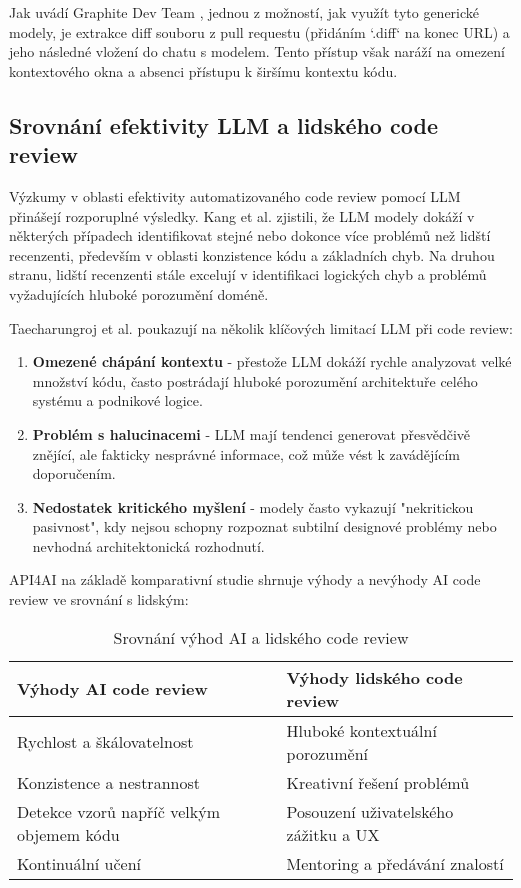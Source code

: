 \documentclass[12pt, a4paper]{article}
\begin{document}
Jak uvádí Graphite Dev Team \cite{graphite2023}, jednou z možností, jak využít tyto generické modely, je extrakce diff souboru z pull requestu (přidáním `.diff` na konec URL) a jeho následné vložení do chatu s modelem. Tento přístup však naráží na omezení kontextového okna a absenci přístupu k širšímu kontextu kódu.

\subsection{Srovnání efektivity LLM a lidského code review}

Výzkumy v oblasti efektivity automatizovaného code review pomocí LLM přinášejí rozporuplné výsledky. Kang et al. \cite{kang2023} zjistili, že LLM modely dokáží v některých případech identifikovat stejné nebo dokonce více problémů než lidští recenzenti, především v oblasti konzistence kódu a základních chyb. Na druhou stranu, lidští recenzenti stále excelují v identifikaci logických chyb a problémů vyžadujících hluboké porozumění doméně.

Taecharungroj et al. \cite{taecharungroj2023} poukazují na několik klíčových limitací LLM při code review:

\begin{enumerate}
    \item \textbf{Omezené chápání kontextu} - přestože LLM dokáží rychle analyzovat velké množství kódu, často postrádají hluboké porozumění architektuře celého systému a podnikové logice.
    \item \textbf{Problém s halucinacemi} - LLM mají tendenci generovat přesvědčivě znějící, ale fakticky nesprávné informace, což může vést k zavádějícím doporučením.
    \item \textbf{Nedostatek kritického myšlení} - modely často vykazují "nekritickou pasivnost", kdy nejsou schopny rozpoznat subtilní designové problémy nebo nevhodná architektonická rozhodnutí.
\end{enumerate}

API4AI \cite{api4ai2023} na základě komparativní studie shrnuje výhody a nevýhody AI code review ve srovnání s lidským:

\begin{table}[H]
\centering
\begin{tabular}{|p{}|p{}|}
\hline
\textbf{Výhody AI code review} & \textbf{Výhody lidského code review} \\
\hline
Rychlost a škálovatelnost & Hluboké kontextuální porozumění \\
Konzistence a nestrannost & Kreativní řešení problémů \\
Detekce vzorů napříč velkým objemem kódu & Posouzení uživatelského zážitku a UX \\
Kontinuální učení & Mentoring a předávání znalostí \\
\hline
\end{tabular}
\caption{Srovnání výhod AI a lidského code review \cite{api4ai2023}}
\end{table}
\end{document}
